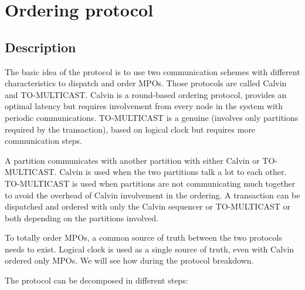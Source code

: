 \documentclass[a4paper, 10pt]{article}
\begin{document}
\section{Ordering protocol}

\subsection{Description}\label{sec:protocol}

The basic idea of the protocol is to use two communication schemes with different characteristics to dispatch and order
MPOs. Those protocols are called Calvin and TO-MULTICAST. Calvin is a round-based ordering protocol, provides an optimal
latency but requires involvement from every node in the system with periodic communications. TO-MULTICAST is a genuine (involves only
partitions required by the transaction), based on logical clock but requires more communication steps.

A partition communicates with another partition with either Calvin or TO-MULTICAST. Calvin is used when
the two partitions talk a lot to each other. TO-MULTICAST is used when partitions are not communicating much together
to avoid the overhead of Calvin involvement in the ordering. A transaction can be dispatched and ordered with only the Calvin sequencer or
TO-MULTICAST or both depending on the partitions involved.

To totally order MPOs, a common source of truth between the two protocols needs to exist. Logical clock
is used as a single source of truth, even with Calvin ordered only MPOs. We will see how during the protocol breakdown.

The protocol can be decomposed in different steps:
\end{document}
